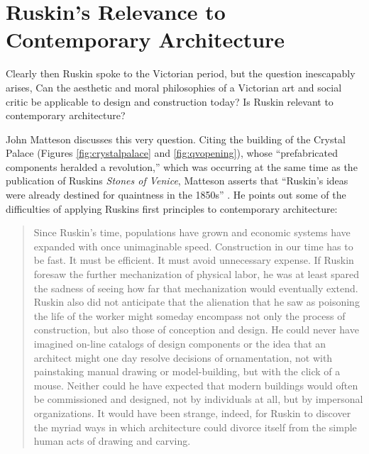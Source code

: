\section[Ruskin's Relevance]{Ruskin's Relevance to Contemporary Architecture}


Clearly then Ruskin spoke to the Victorian period, but the question
inescapably arises, Can the aesthetic and moral philosophies of a
Victorian art and social critic be applicable to design and
construction today?  Is Ruskin relevant to contemporary architecture? 


John Matteson discusses this very question.  Citing the building of the
Crystal Palace (Figures \ref{fig:crystalpalace} and \ref{fig:qvopening}), 
whose ``prefabricated components heralded a
revolution,'' which was occurring at the same time as the publication of
Ruskin{\textquotesingle}s \textit{Stones of Venice}, Matteson asserts
that ``Ruskin’s ideas were already destined for quaintness in the
1850s'' \citep[][pp.~300]{matteson2002}.  He points out some of the difficulties of
applying Ruskin{\textquotesingle}s first principles to contemporary
architecture: 


\begin{quote}
Since Ruskin’s time, populations have grown and economic systems have
expanded with once unimaginable speed.  Construction in our time has to
be fast.  It must be efficient.  It must avoid unnecessary expense.  If
Ruskin foresaw the further mechanization of physical labor, he was at
least spared the sadness of seeing how far that mechanization would
eventually extend.  Ruskin also did not anticipate that the alienation
that he saw as poisoning the life of the worker might someday encompass
not only the process of construction, but also those of conception and
design.  He could never have imagined on-line catalogs of design
components or the idea that an architect might one day resolve
decisions of ornamentation, not with painstaking manual drawing or
model-building, but with the click of a mouse.  Neither could he have
expected that modern buildings would often be commissioned and
designed, not by individuals at all, but by impersonal organizations. 
It would have been strange, indeed, for Ruskin to discover the myriad
ways in which architecture could divorce itself from the simple human
acts of drawing and carving. \citep[][pp.~300]{matteson2002}
\end{quote}

